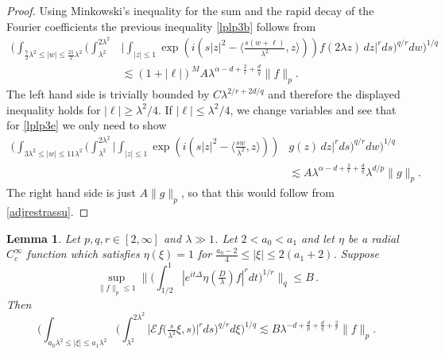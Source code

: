 \documentclass[11pt]{amsart}
\newtheorem{lemma}[theorem]{Lemma}
\theoremstyle{definition}
\numberwithin{theorem}{section}
\numberwithin{definition}{section}
\numberwithin{equation}{section}
\def\inn#1#2{\langle#1,#2\rangle}
\newcommand{\Be}{\begin{equation}}
\newcommand{\Ee}{\end{equation}}
\renewcommand{\le}{\leqslant}
\renewcommand{\ge}{\geqslant}
\def\inn#1#2{\langle#1,#2\rangle}
\def\lc{\lesssim}
\def\la{\lambda}             \def\La{\Lambda}
\def\cE{{\mathcal {E}}}
\renewcommand{\le}{\leqslant}
\renewcommand{\ge}{\geqslant}
\begin{document}
\begin{proof}[Proof]
Using Minkowski's inequality for the sum   and the rapid decay of the Fourier coefficients
 the previous inequality \eqref{lplp3b} follows
  from
\begin{align}
\label{lplp3e} \Big(\int_{\frac72\la^2\le |w|\le \frac{21}{2} \la^2}
\Big(\int_{\la^2}^{2\la^2} &\Big|\int_{|z|\le 1} \exp(i (s|z|^2-\inn
{\frac{s(w+\ell)}{\la^2}}{z} )) f(2\la z) \,dz\Big|^r {ds}
\Big)^{q/r} dw\Big)^{1/q} \\ &\lc (1+|\ell|)^M A\la^{\alpha-d+\frac
2r+\frac dq}\|f\|_p. \nonumber
\end{align}
The left hand side is trivially bounded by $C \la^{2/r+2d/q}$ and
therefore the displayed inequality holds for  $|\ell|\ge \la^2/4$.
If $|\ell|\le \la^2/4$, we change variables and
 see that for  \eqref{lplp3e}  we only need to show
\begin{align*}
\Big(\int_{3\la^2\le |w|\le 11 \la^2}
\Big(\int_{\la^2}^{2\la^2} \Big|\int_{|z|\le 1} \exp(i (s|z|^2-\inn
{\frac{sw}{\la^2}}{z} )) &g(z) \,dz\Big|^r {ds} \Big)^{q/r}
dw\Big)^{1/q} \\ &\lc A\la^{\alpha-d+\frac 2r+\frac
dq}\la^{d/p}\|g\|_p. \nonumber
\end{align*}
The right hand side is just $ A \|g\|_p$, so that this would  follow from
\eqref{adjrestrassu}.
\end{proof}



\begin{lemma} \label{Schrimpliesrestr} Let $p,q,r\in [2,\infty]$ and $\lambda\gg 1$.
 Let $2<a_0<a_1$ and let $\eta$ be a radial $C^\infty_c$ function which satisfies $\eta(\xi)=1$ for
$\frac{a_0-2}{4}\le |\xi|\le 2(a_1+2)$.
  Suppose
\Be\label{lqlrschr2}
\sup_{\|f\|_p\le 1} \Big\| \Big(\int_{1/2}^1 |e^{it\Delta}\eta(\tfrac D\la ) f|^r dt\Big)^{1/r}\Big\|_q \le
B\,.
\Ee
Then
\Be
\label{lqlrext2}
\Big(\int_{a_0\la^2\le |\xi|\le a_1\la^2}\Big(\int_{\la^2}^{2\la^2}
\big|\cE f \big(\tfrac{ s }{\la^2} \xi,  s \big)\big|^r
d s \Big)^{q/r}d\xi\Big)^{1/q}\lc B \la^{-d+\frac dp+\frac dq+\frac
2r } \|f\|_p. %
\Ee
\end{lemma}
\end{document}
